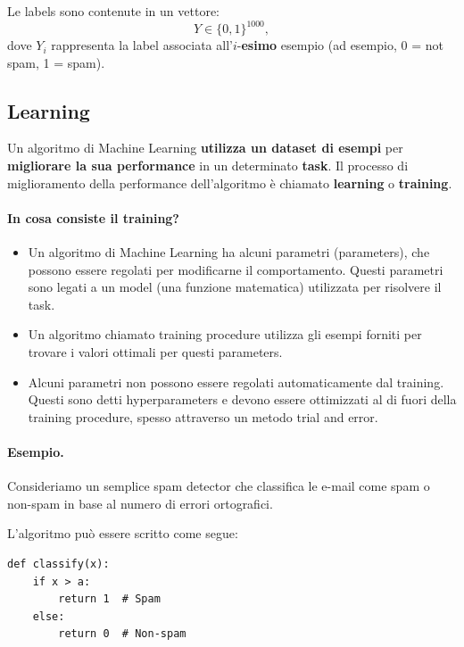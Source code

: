 \noindent
Le labels sono contenute in un vettore:
\[
Y \in \{0,1\}^{1000},
\]
dove $Y_i$ rappresenta la label associata all'$i$-\textbf{esimo} esempio (ad esempio, 0 = not spam, 1 = spam).

\subsection{Learning}

Un algoritmo di Machine Learning \textbf{utilizza un dataset di esempi} per \textbf{migliorare la sua performance} in un determinato \textbf{task}. Il processo di miglioramento della performance dell'algoritmo \`e chiamato \textbf{learning} o \textbf{training}.

\paragraph{In cosa consiste il training?}

\begin{itemize}
\item Un algoritmo di Machine Learning ha alcuni parametri (parameters), che possono essere regolati per modificarne il comportamento. Questi parametri sono legati a un model (una funzione matematica) utilizzata per risolvere il task.
\item Un algoritmo chiamato training procedure utilizza gli esempi forniti per trovare i valori ottimali per questi parameters.
\item Alcuni parametri non possono essere regolati automaticamente dal training. Questi sono detti hyperparameters e devono essere ottimizzati al di fuori della training procedure, spesso attraverso un metodo trial and error.
\end{itemize}

\paragraph{Esempio.}

Consideriamo un semplice spam detector che classifica le e-mail come spam o non-spam in base al numero di errori ortografici.

\noindent
L'algoritmo pu\`o essere scritto come segue:

\begin{lstlisting}[style=py,caption={Soglia sul numero di errori ortografici, chiaramente un approccio naive},label={lst:spam-threshold}]
def classify(x):
    if x > a:
        return 1  # Spam
    else:
        return 0  # Non-spam
\end{lstlisting}

